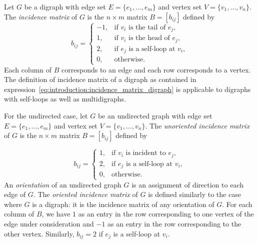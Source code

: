 Let $G$ be a digraph with edge set $E = \{ e_1, \dots, e_m \}$ and
vertex set $V = \{ v_1, \dots, v_n \}$. The \emph{incidence matrix} of
$G$ is the $n \times m$ matrix $B = [b_{ij}]$ defined by
%
\begin{equation}
\label{eq:introduction:incidence_matrix_digraph}
b_{ij}
=
\begin{cases}
-1, & \text{if $v_i$ is the tail of $e_j$}, \\
1,  & \text{if $v_i$ is the head of $e_j$}, \\
2,  & \text{if $e_j$ is a self-loop at $v_i$}, \\
0,  & \text{otherwise}.
\end{cases}
\end{equation}
%
Each column of $B$ corresponds to an edge and each row corresponds to
a vertex. The definition of incidence matrix of a digraph as contained
in expression~\eqref{eq:introduction:incidence_matrix_digraph} is
applicable to digraphs with self-loops as well as multidigraphs.

For the undirected case, let $G$ be an undirected graph with edge set
$E = \{ e_1, \dots, e_m \}$ and vertex set
$V = \{ v_1, \dots, v_n \}$. The \emph{unoriented incidence matrix} of
$G$ is the $n \times m$ matrix $B = [b_{ij}]$ defined by

\[
b_{ij}
=
\begin{cases}
1, & \text{if $v_i$ is incident to $e_j$}, \\
2, & \text{if $e_j$ is a self-loop at $v_i$}, \\
0, & \text{otherwise}.
\end{cases}
\]
An \emph{orientation} of an undirected graph $G$ is an assignment of
direction to each edge of $G$. The \emph{oriented incidence matrix} of
$G$ is defined similarly to the case where $G$ is a digraph: it is the
incidence matrix of any orientation of $G$. For each column of $B$, we
have $1$ as an entry in the row corresponding to one vertex of the
edge under consideration and $-1$ as an entry in the row corresponding
to the other vertex. Similarly, $b_{ij} = 2$ if $e_j$ is a self-loop
at $v_i$.

%


